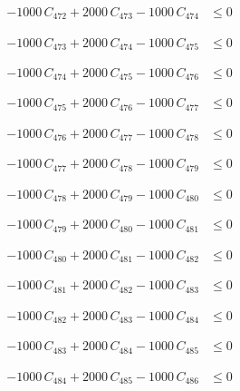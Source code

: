 \documentclass[a4paper,11pt]{article}
\begin{document}
\begin{align}
-1000\,C_{472} + 2000\,C_{473} - 1000\,C_{474} &\leq 0 \nonumber
\end{align}

\begin{align}
-1000\,C_{473} + 2000\,C_{474} - 1000\,C_{475} &\leq 0 \nonumber
\end{align}

\begin{align}
-1000\,C_{474} + 2000\,C_{475} - 1000\,C_{476} &\leq 0 \nonumber
\end{align}

\begin{align}
-1000\,C_{475} + 2000\,C_{476} - 1000\,C_{477} &\leq 0 \nonumber
\end{align}

\begin{align}
-1000\,C_{476} + 2000\,C_{477} - 1000\,C_{478} &\leq 0 \nonumber
\end{align}

\begin{align}
-1000\,C_{477} + 2000\,C_{478} - 1000\,C_{479} &\leq 0 \nonumber
\end{align}

\begin{align}
-1000\,C_{478} + 2000\,C_{479} - 1000\,C_{480} &\leq 0 \nonumber
\end{align}

\begin{align}
-1000\,C_{479} + 2000\,C_{480} - 1000\,C_{481} &\leq 0 \nonumber
\end{align}

\begin{align}
-1000\,C_{480} + 2000\,C_{481} - 1000\,C_{482} &\leq 0 \nonumber
\end{align}

\begin{align}
-1000\,C_{481} + 2000\,C_{482} - 1000\,C_{483} &\leq 0 \nonumber
\end{align}

\begin{align}
-1000\,C_{482} + 2000\,C_{483} - 1000\,C_{484} &\leq 0 \nonumber
\end{align}

\begin{align}
-1000\,C_{483} + 2000\,C_{484} - 1000\,C_{485} &\leq 0 \nonumber
\end{align}

\begin{align}
-1000\,C_{484} + 2000\,C_{485} - 1000\,C_{486} &\leq 0 \nonumber
\end{align}
\end{document}
